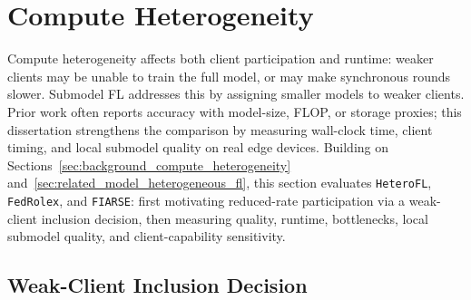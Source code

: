\FloatBarrier
\section{Compute Heterogeneity}
\label{sec:eval_compute_heterogeneity}

Compute heterogeneity affects both client participation and runtime: weaker clients may be unable to train the full model, or may make synchronous rounds slower. Submodel FL addresses this by assigning smaller models to weaker clients. Prior work often reports accuracy with model-size, FLOP, or storage proxies; this dissertation strengthens the comparison by measuring wall-clock time, client timing, and local submodel quality on real edge devices. Building on Sections~\ref{sec:background_compute_heterogeneity} and~\ref{sec:related_model_heterogeneous_fl}, this section evaluates \texttt{HeteroFL}, \texttt{FedRolex}, and \texttt{FIARSE}: first motivating reduced-rate participation via a weak-client inclusion decision, then measuring quality, runtime, bottlenecks, local submodel quality, and client-capability sensitivity.

\FloatBarrier
\subsection{Weak-Client Inclusion Decision}

